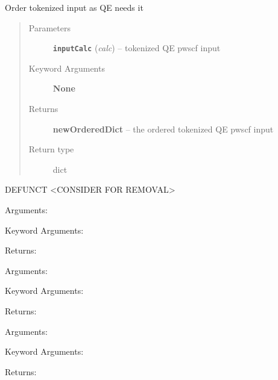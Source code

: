 \documentclass[letterpaper,10pt,english]{sphinxmanual}
\begin{document}

\begin{fulllineitems}
\label{retr:retr.__orderSplitInput}
Order tokenized input as QE needs it
\begin{quote}\begin{description}
\item[{Parameters}] \leavevmode
\textbf{\texttt{inputCalc}} (\emph{calc}) -- tokenized QE pwscf input

\item[{Keyword Arguments}] \leavevmode
\textbf{None}

\item[{Returns}] \leavevmode
\textbf{newOrderedDict} --
the ordered tokenized QE pwscf input

\item[{Return type}] \leavevmode
dict

\end{description}\end{quote}

\end{fulllineitems}


\begin{fulllineitems}
\label{retr:retr.__prefixFromInput}
DEFUNCT \textless{}CONSIDER FOR REMOVAL\textgreater{}

Arguments:

Keyword Arguments:

Returns:

\end{fulllineitems}


\begin{fulllineitems}
\label{retr:retr.__prim2ConvMatrix}
Arguments:

Keyword Arguments:

Returns:

\end{fulllineitems}


\begin{fulllineitems}
\label{retr:retr.__prim2ConvVec}
Arguments:

Keyword Arguments:

Returns:

\end{fulllineitems}
\end{document}
